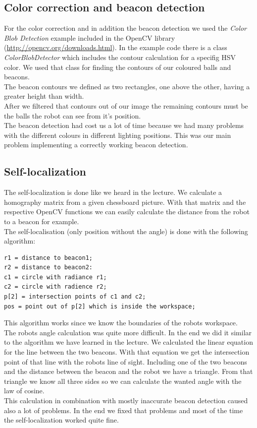 \documentclass[703030]{iisreport}
\begin{document}
\subsection{Color correction and beacon detection}
For the color correction and in addition the beacon detection we used the 
\textit{Color Blob Detection} example included in the OpenCV library \\(\url{http://opencv.org/downloads.html}).
In the example code there is a class \textit{ColorBlobDetector} which includes
the contour calculation for a specifig HSV color. We used that class for finding
the contours of our coloured balls and beacons. \\
The beacon contours we defined as two rectangles, one above the other, having
a greater height than width. \\
After we filtered that contours out of our image the remaining contours must be
the balls the robot can see from it's position. \\
The beacon detection had cost us a lot of time because we had many problems
with the different colours in different lighting positions. This was our main problem
implementing a correctly working beacon detection.

\subsection{Self-localization}
The self-localization is done like we heard in the lecture. We calculate a homography
matrix from a given chessboard picture. With that matrix and the respective OpenCV
functions we can easily calculate the distance from the robot to a beacon for example. \\
The self-localisation (only position without the angle) is done with the following algorithm:

\begin{lstlisting}[mathescape]
r1 = distance to beacon1;
r2 = distance to beacon2:
c1 = circle with radiance r1;
c2 = circle with radience r2;
p[2] = intersection points of c1 and c2;
pos = point out of p[2] which is inside the workspace;
\end{lstlisting}

\noindent This algorithm works since we know the boundaries of the robots workspace. \\
The robots angle calculation was quite more difficult. In the end we did it similar
to the algorithm we have learned in the lecture. We calculated the linear equation
for the line between the two beacons. With that equation we get the intersection point
of that line with the robots line of sight. Including one of the two beacons and the distance
between the beacon and the robot we have a triangle. From that triangle we know
all three sides so we can calculate the wanted angle with the law of cosine. \\
This calculation in combination with mostly inaccurate beacon detection caused also
a lot of problems. In the end we fixed that problems and most of the time the
self-localization worked quite fine.
\end{document}
